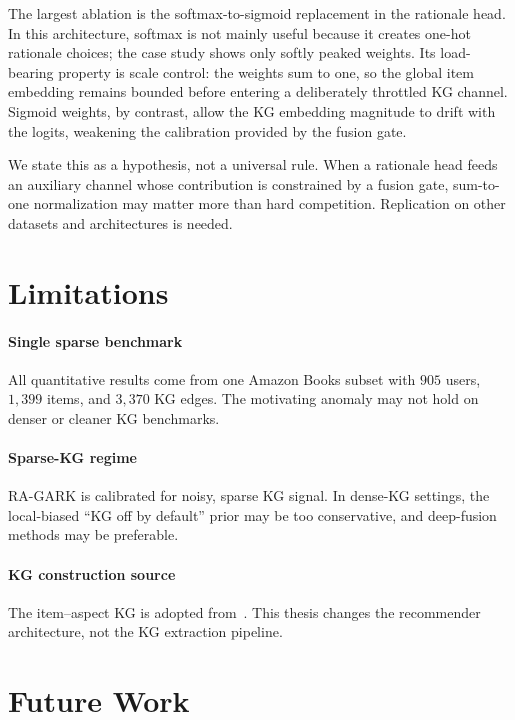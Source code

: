 The largest ablation is the softmax-to-sigmoid replacement in the rationale head. In this architecture, softmax is not mainly useful because it creates one-hot rationale choices; the case study shows only softly peaked weights. Its load-bearing property is scale control: the weights sum to one, so the global item embedding remains bounded before entering a deliberately throttled KG channel. Sigmoid weights, by contrast, allow the KG embedding magnitude to drift with the logits, weakening the calibration provided by the fusion gate.

We state this as a hypothesis, not a universal rule. When a rationale head feeds an auxiliary channel whose contribution is constrained by a fusion gate, sum-to-one normalization may matter more than hard competition. Replication on other datasets and architectures is needed.

\section{Limitations}
\label{sec:conclude-limits}

\paragraph{Single sparse benchmark} All quantitative results come from one Amazon Books subset with $905$ users, $1{,}399$ items, and $3{,}370$ KG edges. The motivating anomaly may not hold on denser or cleaner KG benchmarks.

\paragraph{Sparse-KG regime} RA-GARK is calibrated for noisy, sparse KG signal. In dense-KG settings, the local-biased ``KG off by default'' prior may be too conservative, and deep-fusion methods may be preferable.

\paragraph{KG construction source} The item--aspect KG is adopted from~\cite{ho2024reviewkg}. This thesis changes the recommender architecture, not the KG extraction pipeline.

\section{Future Work}
\label{sec:conclude-future}


